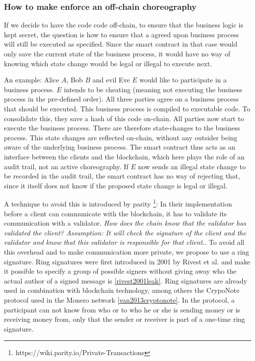 \documentclass[runningheads]{llncs}
\begin{document}
\subsubsection{How to make enforce an off-chain choreography}

If we decide to have the code code off-chain, to ensure that the business logic is kept secret, the question is how to ensure that a agreed upon business process will still be executed as specified. Since the smart contract in that case would only save the current state of the business process, it would have no way of knowing which state change would be legal or illegal to execute next.

An example: Alice $A$, Bob $B$ and evil Eve $E$ would like to participate in a business process. $E$ intends to be cheating (meaning not executing the business process in the pre-defined order). All three parties agree on a business process that should be executed. This business process is compiled to executable code. To consolidate this, they save a hash of this code on-chain. All parties now start to execute the business process. There are therefore state-changes to the business process. This state changes are reflected on-chain, without any outsider being aware of the underlying business process. The smart contract thus acts as an interface between the clients and the blockchain, which here plays the role of an audit trail, not an active choreography. If $E$ now sends an illegal state change to be recorded in the audit trail, the smart contract has no way of rejecting that, since it itself does not know if the proposed state change is legal or illegal.


A technique to avoid this is introduced by parity \footnote{https://wiki.parity.io/Private-Transactions}: In their implementation before a client can communicate with the blockchain, it has to validate its communication with a validator. \textit{How does the chain know that the validator has validated the client? Assumption: It will check the signature of the client and the validator and know that this validator is responsible for that client.}. To avoid all this overhead and to make communication more private, we propose to use a ring signature. Ring signatures were first introduced in 2001 by Rivest et al. and make it possible to specify a group of possible signers without giving away who the actual author of a signed message is \ref{rivest2001leak}. Ring signatures are already used in combination with blockchain technology, among others the CrypoNote protocol used in the Monero network \ref{van2013cryptonote}. In the protocol, a participant can not know from who or to who he or she is sending money or is receiving money from, only that the sender or receiver is part of a one-time ring signature.
\end{document}
